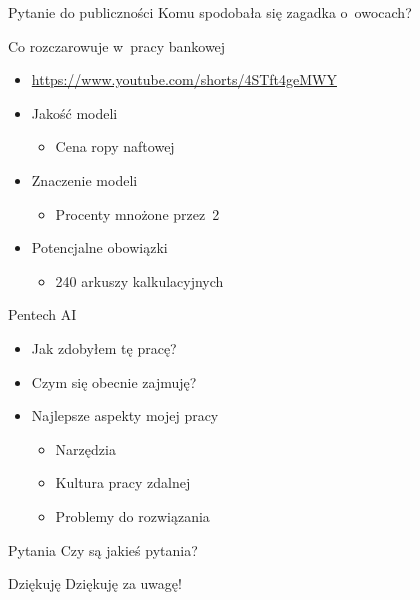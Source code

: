 \documentclass{beamer}
\begin{document}
\begin{frame}{Pytanie do publiczności}
  \centering
  \Large
  Komu spodobała się zagadka o~owocach?
\end{frame}

\begin{frame}{Co rozczarowuje w~pracy bankowej}
  \begin{itemize}
    \item \url{https://www.youtube.com/shorts/4STft4geMWY}
    \item Jakość modeli
      \begin{itemize}
        \item Cena ropy naftowej
      \end{itemize}
    \item Znaczenie modeli
      \begin{itemize}
        \item Procenty mnożone przez~2
      \end{itemize}
    \item Potencjalne obowiązki
      \begin{itemize}
        \item 240 arkuszy kalkulacyjnych
      \end{itemize}
  \end{itemize}
\end{frame}

\begin{frame}{Pentech AI}
  \begin{itemize}
    \item Jak zdobyłem tę pracę?
    \item Czym się obecnie zajmuję?
    \item Najlepsze aspekty mojej pracy
      \begin{itemize}
        \item Narzędzia
        \item Kultura pracy zdalnej
        \item Problemy do rozwiązania
      \end{itemize}
  \end{itemize}
\end{frame}

\begin{frame}{Pytania}
  \centering
  \Large
  Czy są jakieś pytania?
\end{frame}

\begin{frame}{Dziękuję}
  \centering
  \Large
  Dziękuję za uwagę!
\end{frame}
\end{document}
